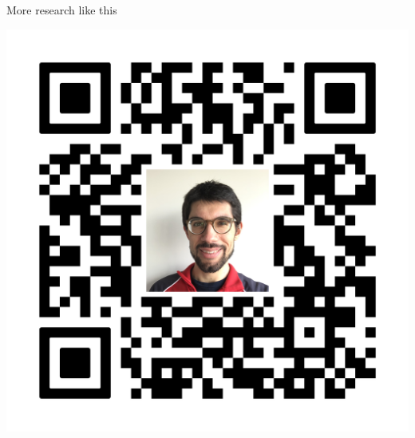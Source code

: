 \documentclass{beamer}\usepackage[]{graphicx}\usepackage[]{xcolor}
\begin{document}
\begin{frame}[fragile]
\begin{columns}
  \begin{column}{.28\textwidth}
    \begin{block}{More research like this}
      \begin{center}
        \includegraphics[width = 15cm]{images/Personal_website.png}
        \end{center}

    \end{block}
  \end{column}

  \end{columns}  

  \bigskip
  {\hrulefill}
  \bigskip


\end{frame}
\end{document}
